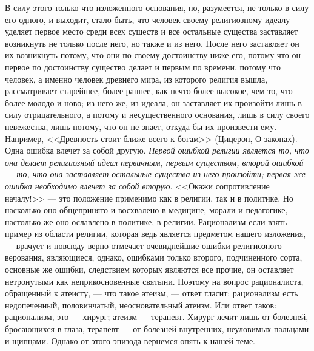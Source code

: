 \documentclass[12pt]{article}
\begin{document}
В силу этого только что изложенного основания, но, разумеется, не только в силу его одного, и выходит, стало быть, что человек своему религиозному идеалу уделяет первое место среди всех существ и все остальные существа заставляет возникнуть не только после него, но также и из него. После него заставляет он их возникнуть потому, что они по своему достоинству ниже его, потому что он первое по достоинству существо делает и первым по времени, потому что человек, а именно человек древнего мира, из которого религия вышла, рассматривает старейшее, более раннее, как нечто более высокое, чем то, что более молодо и ново; из него же, из идеала, он заставляет их произойти лишь в силу отрицательного, а потому и несущественного основания, лишь в силу своего невежества, лишь потому, что он не знает, откуда бы их произвести ему. Например, <<Древность стоит ближе всего к богам>> (Цицерон, О законах). Одна ошибка влечет за собой другую. \emph{Первой ошибкой религии является то, что она делает религиозный идеал первичным, первым существом, второй ошибкой --- то, что она заставляет остальные существа из него произойти; первая же ошибка необходимо влечет за собой вторую}. <<Окажи сопротивление началу!>> --- это положение применимо как в религии, так и в политике. Но насколько оно общепринято и восхвалено в медицине, морали и педагогике, настолько же оно ославлено в политике, в религии. Рационализм если взять пример из области религии, которая ведь является предметом нашего изложения, --- врачует и повсюду верно отмечает очевиднейшие ошибки религиозного верования, являющиеся, однако, ошибками только второго, подчиненного сорта, основные же ошибки, следствием которых являются все прочие, он оставляет нетронутыми как неприкосновенные святыни. Поэтому на вопрос рационалиста, обращенный к атеисту, --- что такое атеизм, --- ответ гласит: рационализм есть недопеченный, половинчатый, неосновательный атеизм. Или ответ таков: рационализм, это --- хирург; атеизм --- терапевт. Хирург лечит лишь от болезней, бросающихся в глаза, терапевт --- от болезней внутренних, неуловимых пальцами и щипцами. Однако от этого эпизода вернемся опять к нашей теме. 
\end{document}
